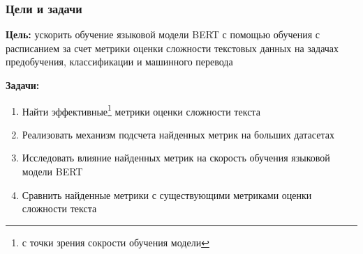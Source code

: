 \documentclass{beamer}
\begin{document}
\begin{frame}
	\frametitle{Цели и задачи}
	{\bf Цель:} ускорить обучение языковой модели BERT с помощью обучения с расписанием за счет метрики оценки сложности текстовых данных на задачах предобучения, классификации и машинного перевода

	{\bf Задачи:}
	\begin{enumerate}
		\item Найти эффективные\footnote[1]{с точки зрения сокрости обучения модели} метрики оценки сложности текста
		\item Реализовать механизм подсчета найденных метрик на больших датасетах
		\item Исследовать влияние найденных метрик на скорость обучения языковой модели BERT
		\item Сравнить найденные метрики с существующими метриками оценки сложности текста
	\end{enumerate}
\end{frame}
\end{document}
